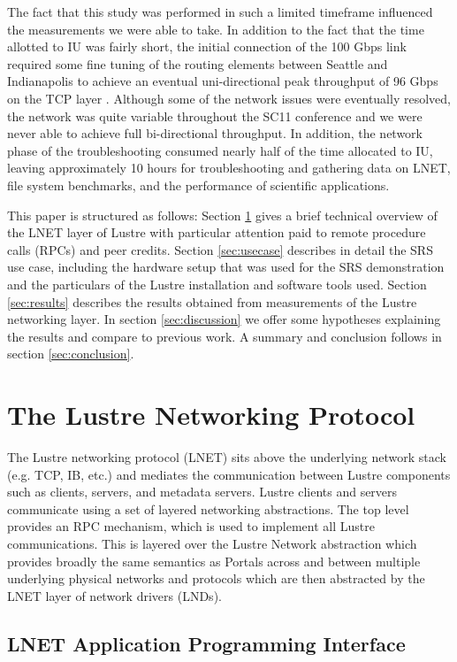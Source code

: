 \documentclass[]{sigplan-proc}
\begin{document}
The fact that this study was performed in such a limited timeframe influenced the measurements we were able to
take. In addition to the fact that the time allotted to IU was fairly short, the initial connection of the 100
Gbps link required some fine tuning of the routing elements between Seattle and Indianapolis to achieve an
eventual uni-directional peak throughput of 96 Gbps on the TCP layer \cite{henschel2012}. Although some of the
network issues were eventually resolved, the network was quite variable throughout the SC11 conference and we
were never able to achieve full bi-directional throughput. In addition, the network phase of the
troubleshooting consumed nearly half of the time allocated to IU, leaving approximately 10 hours for
troubleshooting and gathering data on LNET, file system benchmarks, and the performance of scientific
applications.

This paper is structured as follows: Section \ref{sec:LNET} gives a brief technical overview of the LNET layer
of Lustre with particular attention paid to remote procedure calls (RPCs) and peer credits. Section
\ref{sec:usecase} describes in detail the SRS use case, including the hardware setup that was used for the SRS
demonstration and the particulars of the Lustre installation and software tools used. Section
\ref{sec:results} describes the results obtained from measurements of the Lustre networking layer. In section
\ref{sec:discussion} we offer some hypotheses explaining the results and compare to previous work. A summary and conclusion follows in section \ref{sec:conclusion}.

\section{The Lustre Networking Protocol}\label{sec:LNET}

The Lustre networking protocol (LNET) sits above the underlying network stack (e.g. TCP, IB, etc.) and
mediates the communication between Lustre components such as clients, servers, and metadata servers.  Lustre
clients and servers communicate using a set of layered networking abstractions.  The top level provides an RPC
mechanism, which is used to implement all Lustre communications.  This is layered over the Lustre Network
abstraction which provides broadly the same semantics as Portals \cite{portalspec} across and between multiple
underlying physical networks and protocols which are then abstracted by the LNET layer of network drivers (LNDs).

\subsection{LNET Application Programming Interface}
\end{document}
